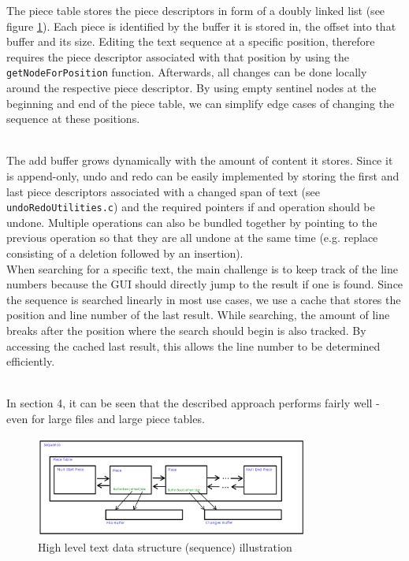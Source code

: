 The piece table stores the piece descriptors in form of a doubly linked list (see figure \ref{fig:sequence}). Each piece is identified by the buffer it is stored in, the offset into that buffer and its size. Editing the text sequence at a specific position, therefore requires the piece descriptor associated with that position by using the \verb|getNodeForPosition| function. Afterwards, all changes can be done locally around the respective piece descriptor. By using empty sentinel nodes at the beginning and end of the piece table, we can simplify edge cases of changing the sequence at these positions.

\noindent
\\The add buffer grows dynamically with the amount of content it stores. Since it is append-only, undo and redo can be easily implemented by storing the first and last piece descriptors associated with a changed span of text (see \verb|undoRedoUtilities.c|) and the required pointers if and operation should be undone. Multiple operations can also be bundled together by pointing to the previous operation so that they are all undone at the same time (e.g. replace consisting of a deletion followed by an insertion). \\
When searching for a specific text, the main challenge is to keep track of the line numbers because the GUI should directly jump to the result if one is found. Since the sequence is searched linearly in most use cases, we use a cache that stores the position and line number of the last result. While searching, the amount of line breaks after the position where the search should begin is also tracked. By accessing the cached last result, this allows the line number to be determined efficiently.

\noindent
\\In section 4, it can be seen that the described approach performs fairly well - even for large files and large piece tables.

\begin{figure}[H]
\centering
\includegraphics[width=0.8\textwidth]{./images/sequenceIllustration.png}
\caption{High level text data structure (sequence) illustration}
\label{fig:sequence}
\end{figure}

